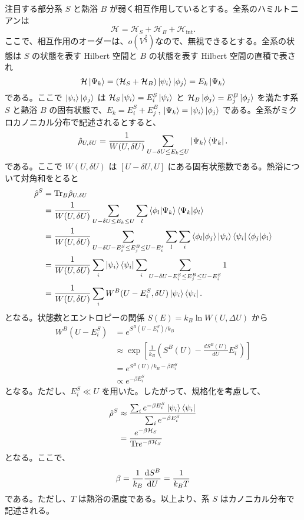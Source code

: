 \documentclass[a4paper,11pt]{jsarticle}
\numberwithin{equation}{section}
\begin{document}
注目する部分系 $S$ と熱浴 $B$ が弱く相互作用しているとする。全系のハミルトニアンは
\begin{equation}
\mathcal{H} = \mathcal{H}_S + \mathcal{H}_B + \mathcal{H}_{\text{int}}.
\end{equation}
ここで、相互作用のオーダーは、$o(V^\frac{2}{3})$なので、無視できるとする。全系の状態は $S$ の状態を表す Hilbert 空間と $B$ の状態を表す Hilbert 空間の直積で表され
\begin{equation}
\mathcal{H}\ket{\Psi_k} = (\mathcal{H}_S + \mathcal{H}_B)\ket{\psi_i}\ket{\phi_j} = E_k \ket{\Psi_k}
\end{equation}
である。ここで \(\ket{\psi_i} \ket{\phi_j}\) は \(\mathcal{H}_S \ket{\psi_i} = E^S_i \ket{\psi_i}\) と \(\mathcal{H}_B \ket{\phi_j} = E^B_j \ket{\phi_j}\) を満たす系 \(S\) と熱浴 \(B\) の固有状態で、\(E_k = E^S_i + E^B_j\), \(\ket{\Psi_k} = \ket{\psi_i} \ket{\phi_j}\) である。全系がミクロカノニカル分布で記述されるとすると、
\begin{equation}
\hat{\rho}_{U, \delta U} = \frac{1}{W(U, \delta U)} \sum_{U-\delta U \leq E_k \leq U} \ket{\Psi_k} \bra{\Psi_k}.
\end{equation}
である。ここで \(W(U,\delta U)\) は \([U-\delta U, U]\) にある固有状態数である。熱浴について対角和をとると
\begin{align}
\hat{\rho}^S &= \text{Tr}_B \hat{\rho}_{U, \delta U} \\
&= \frac{1}{W(U, \delta U)} \sum_{U-\delta U \leq E_k \leq U} \sum_l \bra{\phi_l} \ket{\Psi_k} \bra{\Psi_k} \ket{\phi_l} \\
&= \frac{1}{W(U, \delta U)} \sum_{U-\delta U -E_i^S \leq  E_j^B \leq U-E_i^s} \sum_l \sum_{i} \bra{\phi_l} \ket{\phi_j} \ket{\psi_i} \bra{\psi_i} \bra{\phi_j} \ket{\phi_l} \\
&= \frac{1}{W(U, \delta U)} \sum_i \ket{\psi_i} \bra{\psi_i} \sum_{i} \sum_{U - \delta U -E_i^S \leq E_j^B \leq U - E_i^S} 1 \\
&= \frac{1}{W(U, \delta U)} \sum_i W^B(U - E_i^S, \delta U) \ket{\psi_i} \bra{\psi_i}.
\end{align}
となる。状態数とエントロピーの関係 \(S(E) = k_B \ln W(U, \Delta U)\) から
\begin{align}
W^B(U - E_i^S) &= e^{S^B(U - E_i^S)/k_B}\\ 
&\approx \exp\left[ \frac{1}{k_B} \left( S^B(U) - \frac{d S^B(U)}{dU} E_i^S \right) \right] \\
&= e^{S^B(U)/k_B - \beta E_i^S} \\
&\propto e^{-\beta E_i^S}
\end{align}
となる。ただし、$E_i^S\ll U$ を用いた。したがって、規格化を考慮して、
\begin{align}
  \hat{\rho}^S &\approx \frac{\sum_i e^{-\beta E_i^S} \ket{\psi_i} \bra{\psi_i}}{\sum_i e^{-\beta E_i^S}} \\
  &= \frac{e^{-\beta \mathcal{H}_S}}{\text{Tr} e^{-\beta \mathcal{H}_S}}
\end{align}
となる。ここで、
\begin{equation}
  \beta = \frac{1}{k_B}\dv{S^B}{U} = \frac{1}{k_B T}
\end{equation}
である。ただし、\(T\) は熱浴の温度である。以上より、系 \(S\) はカノニカル分布で記述される。
\end{document}
